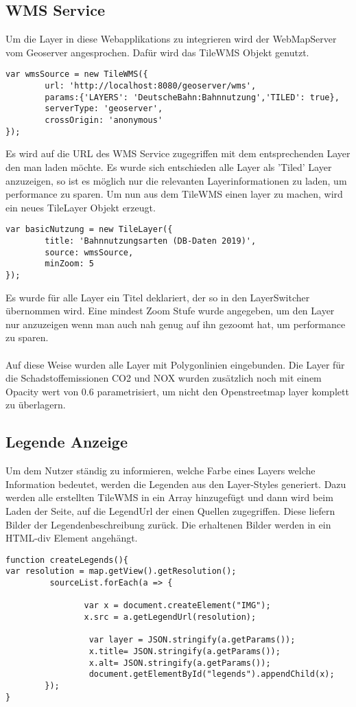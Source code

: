 \subsection{WMS Service}
Um die Layer in diese Webapplikations zu integrieren wird der WebMapServer vom Geoserver angesprochen.
Dafür wird das TileWMS Objekt genutzt.
\begin{lstlisting}[frame=single,basicstyle=\small]
var wmsSource = new TileWMS({
        url: 'http://localhost:8080/geoserver/wms',
        params:{'LAYERS': 'DeutscheBahn:Bahnnutzung','TILED': true},
        serverType: 'geoserver',
        crossOrigin: 'anonymous'
});
\end{lstlisting}
Es wird auf die URL des WMS Service zugegriffen mit dem entsprechenden Layer den man laden möchte.
Es wurde sich entschieden alle Layer als 'Tiled' Layer anzuzeigen, so ist es möglich nur die relevanten Layerinformationen zu laden, um performance zu sparen.
Um nun aus dem TileWMS einen layer zu machen, wird ein neues TileLayer Objekt erzeugt.
\begin{lstlisting}[frame=single,basicstyle=\small]
var basicNutzung = new TileLayer({
        title: 'Bahnnutzungsarten (DB-Daten 2019)',
        source: wmsSource,
        minZoom: 5
});
\end{lstlisting}
Es wurde für alle Layer ein Titel deklariert, der so in den LayerSwitcher übernommen wird. Eine mindest Zoom Stufe wurde angegeben, um den Layer nur anzuzeigen wenn man auch nah genug auf ihn gezoomt hat, um performance zu sparen.
\\\\
Auf diese Weise wurden alle Layer mit Polygonlinien eingebunden.
Die Layer für die Schadstoffemissionen CO2 und NOX wurden zusätzlich noch mit einem Opacity wert von 0.6 parametrisiert, um nicht den Openstreetmap layer komplett zu überlagern. 

\subsection{Legende Anzeige}
Um dem Nutzer ständig zu informieren, welche Farbe eines Layers welche Information bedeutet, werden die Legenden aus den Layer-Styles generiert.
Dazu werden alle erstellten TileWMS in ein Array hinzugefügt und dann wird beim Laden der Seite, auf die LegendUrl der einen Quellen zugegriffen. Diese liefern Bilder der Legendenbeschreibung zurück. Die erhaltenen Bilder werden in ein HTML-div Element angehängt.
\begin{lstlisting}[frame=single,basicstyle=\small]
function createLegends(){
var resolution = map.getView().getResolution();
         sourceList.forEach(a => {
                
                var x = document.createElement("IMG");
                x.src = a.getLegendUrl(resolution);
                
                 var layer = JSON.stringify(a.getParams());
                 x.title= JSON.stringify(a.getParams());
                 x.alt= JSON.stringify(a.getParams());
                 document.getElementById("legends").appendChild(x);
        });
}
\end{lstlisting}

